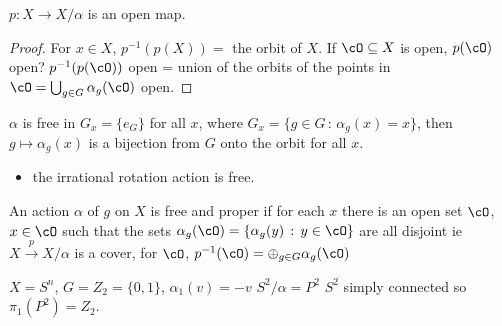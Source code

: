 \begin{proposition}
    $p: X \to X/\alpha$ is an open map. 
\end{proposition}

\begin{proof}
    For $x \in X$, $p^{-1}(p(X)) = $ the orbit of $X$. If $\cO \subseteq X$ is open, $p(\cO)$ open? $p^{-1}(p(\cO))$ open = union of the orbits of the points in $\cO = \bigcup_{g \in G} \alpha_g(\cO)$ open. 
\end{proof}

\begin{definition}
    $\alpha$ is free in $G_x = \{e_G\}$ for all $x$, where $G_x = \{g \in G \, : \, \alpha_g(x)=x\}$, then $g \mapsto \alpha_g(x)$ is a bijection from $G$ onto the orbit for all $x$. 
\end{definition}

\begin{itemize}
    \item the irrational rotation action is free. 
\end{itemize}

\begin{definition}
    An action $\alpha$ of $g$ on $X$ is free and proper if for each $x$ there is an open set $\cO$, $x \in \cO$ such that the sets $\alpha_g(\cO) = \{\alpha_g(y) \, : \, y \in \cO\}$ are all disjoint ie $X \stackrel{p}{\to} X/\alpha$ is a cover, for $\cO$, $p^{-1}(\cO) = \oplus_{g \in G} \alpha_g(\cO)$ 
\end{definition}

\begin{example}
    $X = S^n$, $G = Z_2 = \{0,1\}$, $\alpha_1(v)=-v$ $S^2 /\alpha = P^2$ $S^2$ simply connected so $\pi_1(P^2) = Z_2$. 
\end{example}